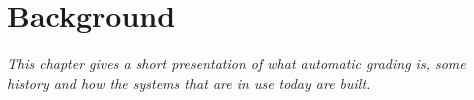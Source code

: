 \chapter{Background}

\textit{This chapter gives a short presentation of what automatic grading is, some history and how the systems that are in use today are built.}






